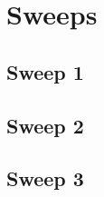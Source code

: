 \chapter{Sweeps}
\label{app:sweep}


\clearpage
\section{Sweep 1}
\label{app:sweep_1}


\clearpage
\section{Sweep 2}
\label{app:sweep_2}


\clearpage
\section{Sweep 3}
\label{app:sweep_3}

